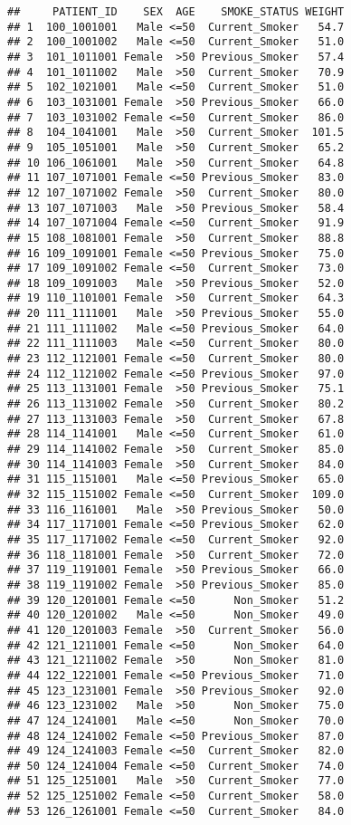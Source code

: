 \documentclass[
]{article}
\begin{document}
\begin{verbatim}
##     PATIENT_ID    SEX  AGE    SMOKE_STATUS WEIGHT
## 1  100_1001001   Male <=50  Current_Smoker   54.7
## 2  100_1001002   Male <=50  Current_Smoker   51.0
## 3  101_1011001 Female  >50 Previous_Smoker   57.4
## 4  101_1011002   Male  >50  Current_Smoker   70.9
## 5  102_1021001   Male <=50  Current_Smoker   51.0
## 6  103_1031001 Female  >50 Previous_Smoker   66.0
## 7  103_1031002 Female <=50  Current_Smoker   86.0
## 8  104_1041001   Male  >50  Current_Smoker  101.5
## 9  105_1051001   Male  >50  Current_Smoker   65.2
## 10 106_1061001   Male  >50  Current_Smoker   64.8
## 11 107_1071001 Female <=50 Previous_Smoker   83.0
## 12 107_1071002 Female  >50  Current_Smoker   80.0
## 13 107_1071003   Male  >50 Previous_Smoker   58.4
## 14 107_1071004 Female <=50  Current_Smoker   91.9
## 15 108_1081001 Female  >50  Current_Smoker   88.8
## 16 109_1091001 Female <=50 Previous_Smoker   75.0
## 17 109_1091002 Female <=50  Current_Smoker   73.0
## 18 109_1091003   Male  >50 Previous_Smoker   52.0
## 19 110_1101001 Female  >50  Current_Smoker   64.3
## 20 111_1111001   Male  >50 Previous_Smoker   55.0
## 21 111_1111002   Male <=50 Previous_Smoker   64.0
## 22 111_1111003   Male <=50  Current_Smoker   80.0
## 23 112_1121001 Female <=50  Current_Smoker   80.0
## 24 112_1121002 Female <=50 Previous_Smoker   97.0
## 25 113_1131001 Female  >50 Previous_Smoker   75.1
## 26 113_1131002 Female  >50  Current_Smoker   80.2
## 27 113_1131003 Female  >50  Current_Smoker   67.8
## 28 114_1141001   Male <=50  Current_Smoker   61.0
## 29 114_1141002 Female  >50  Current_Smoker   85.0
## 30 114_1141003 Female  >50  Current_Smoker   84.0
## 31 115_1151001   Male <=50 Previous_Smoker   65.0
## 32 115_1151002 Female <=50  Current_Smoker  109.0
## 33 116_1161001   Male  >50 Previous_Smoker   50.0
## 34 117_1171001 Female <=50 Previous_Smoker   62.0
## 35 117_1171002 Female <=50  Current_Smoker   92.0
## 36 118_1181001 Female  >50  Current_Smoker   72.0
## 37 119_1191001 Female  >50 Previous_Smoker   66.0
## 38 119_1191002 Female  >50 Previous_Smoker   85.0
## 39 120_1201001 Female <=50      Non_Smoker   51.2
## 40 120_1201002   Male <=50      Non_Smoker   49.0
## 41 120_1201003 Female  >50  Current_Smoker   56.0
## 42 121_1211001 Female <=50      Non_Smoker   64.0
## 43 121_1211002 Female  >50      Non_Smoker   81.0
## 44 122_1221001 Female <=50 Previous_Smoker   71.0
## 45 123_1231001 Female  >50 Previous_Smoker   92.0
## 46 123_1231002   Male  >50      Non_Smoker   75.0
## 47 124_1241001   Male <=50      Non_Smoker   70.0
## 48 124_1241002 Female <=50 Previous_Smoker   87.0
## 49 124_1241003 Female <=50  Current_Smoker   82.0
## 50 124_1241004 Female <=50  Current_Smoker   74.0
## 51 125_1251001   Male  >50  Current_Smoker   77.0
## 52 125_1251002 Female <=50  Current_Smoker   58.0
## 53 126_1261001 Female <=50  Current_Smoker   84.0
\end{verbatim}
\end{document}
